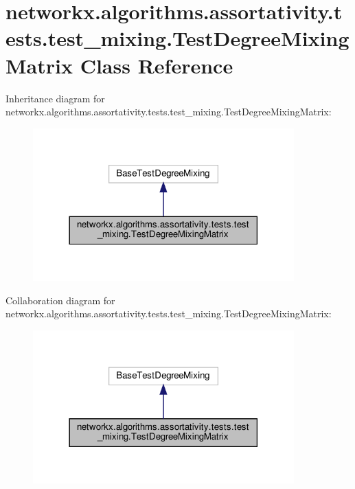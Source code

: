 \hypertarget{classnetworkx_1_1algorithms_1_1assortativity_1_1tests_1_1test__mixing_1_1TestDegreeMixingMatrix}{}\section{networkx.\+algorithms.\+assortativity.\+tests.\+test\+\_\+mixing.\+Test\+Degree\+Mixing\+Matrix Class Reference}
\label{classnetworkx_1_1algorithms_1_1assortativity_1_1tests_1_1test__mixing_1_1TestDegreeMixingMatrix}


Inheritance diagram for networkx.\+algorithms.\+assortativity.\+tests.\+test\+\_\+mixing.\+Test\+Degree\+Mixing\+Matrix\+:
\nopagebreak
\begin{figure}[H]
\begin{center}
\leavevmode
\includegraphics[width=285pt]{classnetworkx_1_1algorithms_1_1assortativity_1_1tests_1_1test__mixing_1_1TestDegreeMixingMatrix__inherit__graph}
\end{center}
\end{figure}


Collaboration diagram for networkx.\+algorithms.\+assortativity.\+tests.\+test\+\_\+mixing.\+Test\+Degree\+Mixing\+Matrix\+:
\nopagebreak
\begin{figure}[H]
\begin{center}
\leavevmode
\includegraphics[width=285pt]{classnetworkx_1_1algorithms_1_1assortativity_1_1tests_1_1test__mixing_1_1TestDegreeMixingMatrix__coll__graph}
\end{center}
\end{figure}
